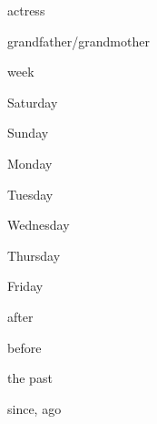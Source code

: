 \begin{flashcard}{\LARGE actress}
\LARGE {}
\end{flashcard}
\begin{flashcard}{\LARGE grandfather/grandmother}
\LARGE {}
\end{flashcard}
\begin{flashcard}{\LARGE week}
\LARGE {}
\end{flashcard}
\begin{flashcard}{\LARGE Saturday}
\LARGE {}
\end{flashcard}
\begin{flashcard}{\LARGE Sunday}
\LARGE {}
\end{flashcard}
\begin{flashcard}{\LARGE Monday}
\LARGE {}
\end{flashcard}
\begin{flashcard}{\LARGE Tuesday}
\LARGE {}
\end{flashcard}
\begin{flashcard}{\LARGE Wednesday}
\LARGE {}
\end{flashcard}
\begin{flashcard}{\LARGE Thursday}
\LARGE {}
\end{flashcard}
\begin{flashcard}{\LARGE Friday}
\LARGE {}
\end{flashcard}
\begin{flashcard}{\LARGE after}
\LARGE {}
\end{flashcard}
\begin{flashcard}{\LARGE before}
\LARGE {}
\end{flashcard}
\begin{flashcard}{\LARGE the past}
\LARGE {}
\end{flashcard}
\begin{flashcard}{\LARGE since, ago}
\LARGE {}
\end{flashcard}
